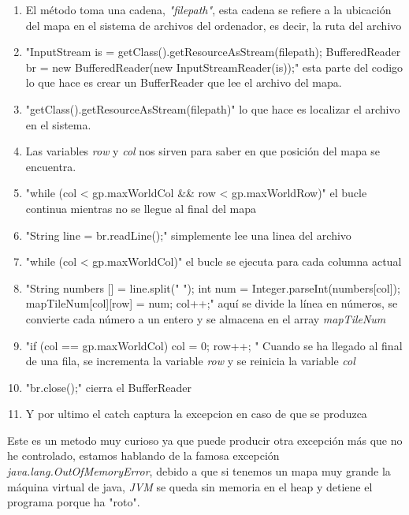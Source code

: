 \documentclass[a4paper]{article}
\begin{document}
\begin{enumerate}
    \item El método toma una cadena, \textit{"filepath"}, esta cadena se refiere a la ubicación del mapa en el sistema de archivos del ordenador, es decir, la ruta del archivo
    \item "InputStream is = getClass().getResourceAsStream(filepath); BufferedReader br = new BufferedReader(new InputStreamReader(is));" esta parte del codigo lo que hace es crear un BufferReader que lee el archivo del mapa.
    \item "getClass().getResourceAsStream(filepath)" lo que hace es localizar el archivo en el sistema.
    \item Las variables \textit{row} y \textit{col} nos sirven para saber en que posición del mapa se encuentra.
    \item "while (col < gp.maxWorldCol \&\& row < gp.maxWorldRow)" el bucle continua mientras no se llegue al final del mapa
    \item "String line = br.readLine();" simplemente lee una linea del archivo
    \item "while (col < gp.maxWorldCol)" el bucle se ejecuta para cada columna actual
    \item "String numbers [] = line.split(" "); int num = Integer.parseInt(numbers[col]); mapTileNum[col][row] = num; col++;" aquí se divide la línea en números, se convierte cada número a un entero y se almacena en el array \textit{mapTileNum}
    \item "if (col == gp.maxWorldCol){ col = 0; row++; }" Cuando se ha llegado al final de una fila, se incrementa la variable \textit{row} y se reinicia la variable \textit{col}
    \item "br.close();" cierra el BufferReader
    \item Y por ultimo el catch captura la excepcion en caso de que se produzca
\end{enumerate}
Este es un metodo muy curioso ya que puede producir otra excepción más que no he controlado, estamos hablando de la famosa excepción \textit{java.lang.OutOfMemoryError}, debido a que si tenemos un mapa muy grande
la máquina virtual de java, \textit{JVM} se queda sin memoria en el heap y detiene el programa porque ha "roto".
\clearpage
\end{document}
